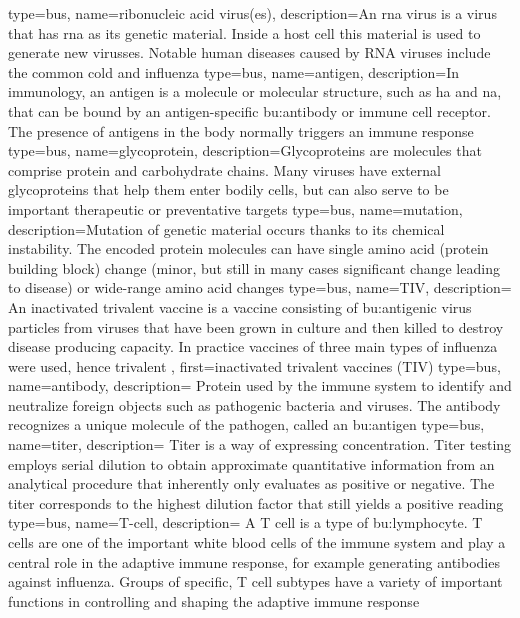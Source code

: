{
    type=bus,
    name=ribonucleic acid virus(es),
    description={An \acrshort{rna} virus is a virus that has \acrshort{rna} as
    its genetic material. Inside a host cell this material is used to generate
    new virusses. Notable human diseases caused by RNA viruses include the
    common cold and influenza}
}
{
    type=bus,
    name=antigen,
    description={In immunology, an antigen is a molecule or molecular
    structure, such as \acrshort{ha} and \acrshort{na}, that can be bound by an
    antigen-specific \gls{bu:antibody} or immune cell receptor.  The presence of
    antigens in the body normally triggers an immune response
    }
}
{
    type=bus,
    name=glycoprotein,
    description={Glycoproteins are molecules that comprise protein and
    carbohydrate chains. Many viruses have external glycoproteins that
    help them enter bodily cells, but can also serve to be important
    therapeutic or preventative targets}
}
{
    type=bus,
    name=mutation,
    description={Mutation of genetic material occurs thanks to its chemical
    instability. The encoded protein molecules can have single amino acid
    (protein building block) change (minor, but still in many cases significant
    change leading to disease) or wide-range amino acid changes}
}
{
    type=bus,
    name=TIV,
    description={
        An inactivated trivalent vaccine is a vaccine consisting of \gls{bu:antigen}ic virus particles from viruses that have been grown in culture and then killed to destroy disease producing capacity.
        In practice vaccines of three main types of influenza were used, hence trivalent
    },
    first={inactivated trivalent vaccines (TIV)}
}
{
    type=bus,
    name=antibody,
    description={ Protein used by the immune system to identify and neutralize foreign objects such as pathogenic bacteria     and viruses.
    The antibody recognizes a unique molecule of the pathogen, called an \gls{bu:antigen}}
}
{
    type=bus,
    name=titer,
    description={
    Titer is a way of expressing concentration.
    Titer testing employs serial dilution to obtain approximate quantitative information from an analytical procedure that inherently only evaluates as positive or negative.
    The titer corresponds to the highest dilution factor that still yields a positive reading
    }
}
{
    type=bus,
    name=T-cell,
    description={
        A T cell is a type of \gls{bu:lymphocyte}.
        T cells are one of the important white blood cells of the immune system and play a central role in the adaptive immune response, for example generating antibodies against influenza.
        Groups of specific, T cell subtypes have a variety of important functions in controlling and shaping the adaptive immune response
    }
}
